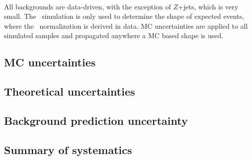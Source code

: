 \paragraph{}
All backgrounds are data-driven, with the exception of $Z$+jets, which is very small. The \ttbar\ simulation is only used to determine the shape of expected events, where the \ttbar\ normalization is derived in data. MC uncertainties are applied to all simulated samples and propagated anywhere a MC based shape is used.

\subsection{MC uncertainties}
\label{sec:boosted-systematics-mc}


\subsection{Theoretical uncertainties}
\label{sec:boosted-systematics-theory}


\subsection{Background prediction uncertainty}
\label{sec:boosted-systematics-bkg}


\subsection{Summary of systematics}
\label{sec:boosted-systematics-numbers}

